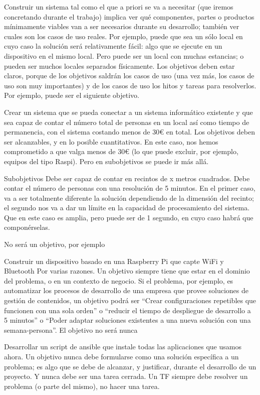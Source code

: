 Construir un sistema tal como el que a priori se va a necesitar (que iremos concretando durante el trabajo) implica ver qué componentes, partes o productos mínimamente viables van a ser necesarios durante su desarrollo; también ver cuales son los casos de uso reales. Por ejemplo, puede que sea un sólo local en cuyo caso la solución será relativamente fácil: algo que se ejecute en un dispositivo en el mismo local. Pero puede ser un local con muchas estancias; o pueden ser muchos locales separados físicamente. Los objetivos deben estar claros, porque de los objetivos saldrán los casos de uso (una vez más, los casos de uso son muy importantes) y de los casos de uso los hitos y tareas para resolverlos. Por ejemplo, puede ser el siguiente objetivo.

Crear un sistema que se pueda conectar a un sistema informático existente y que sea capaz de contar el número total de personas en un local así como tiempo de permanencia, con el sistema costando menos de 30€ en total.
Los objetivos deben ser alcanzables, y en lo posible cuantitativos. En este caso, nos hemos comprometido a que valga menos de 30€ (lo que puede excluir, por ejemplo, equipos del tipo Raspi). Pero en subobjetivos se puede ir más allá.

Subobjetivos
Debe ser capaz de contar en recintos de x metros cuadrados.
Debe contar el número de personas con una resolución de 5 minutos.
En el primer caso, va a ser totalmente diferente la solución dependiendo de la dimensión del recinto; el segundo nos va a dar un límite en la capacidad de procesamiento del sistema. Que en este caso es amplia, pero puede ser de 1 segundo, en cuyo caso habrá que componérselas.

No será un objetivo, por ejemplo

Construir un dispositivo basado en una Raspberry Pi que capte WiFi y Bluetooth
Por varias razones. Un objetivo siempre tiene que estar en el dominio del problema, o en un contexto de negocio. Si el problema, por ejemplo, es automatizar los procesos de desarrollo de una empresa que provee soluciones de gestión de contenidos, un objetivo podrá ser “Crear configuraciones repetibles que funcionen con una sola orden” o “reducir el tiempo de despliegue de desarrollo a 5 minutos” o “Poder adaptar soluciones existentes a una nueva solución con una semana-persona”. El objetivo no será nunca

Desarrollar un script de ansible que instale todas las aplicaciones que usamos ahora.
Un objetivo nunca debe formularse como una solución específica a un problema; es algo que se debe de alcanzar, y justificar, durante el desarrollo de un proyecto. Y nunca debe ser una tarea cerrada. Un TF siempre debe resolver un problema (o parte del mismo), no hacer una tarea.

